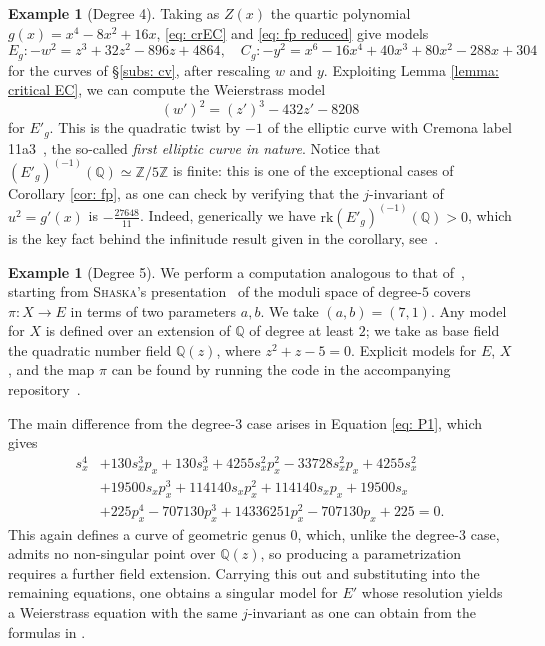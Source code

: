 \documentclass[a4paper,twoside,english]{amsart}
\theoremstyle{plain}
\theoremstyle{definition}
\newtheorem{example}[theorem]{Example}
\begin{document}
\begin{example}[Degree 4]
Taking as $Z(x)$ the quartic polynomial $g(x)=x^4-8x^2+16x$, \eqref{eq: crEC} and \eqref{eq: fp reduced} give models 
\[ E_g:-w^2=z^3 + 32z^2 - 896z + 4864, \quad C_g:-y^2=x^6 - 16x^4 + 40x^3 + 80x^2 - 288x + 304 \]
for the curves of \S\ref{subs: cv}, after rescaling $w$ and $y$. Exploiting Lemma \ref{lemma: critical EC}, we can compute the Weierstrass model $$(w')^2=(z')^3-432z'-8208$$ for $E'_g$. This is the quadratic twist by $-1$ of the elliptic curve with Cremona label 11a3~\cite{lmfdb}, the so-called \textit{first elliptic curve in nature}. Notice that $(E'_g)^{(-1)}(\mathbb{Q})\simeq\mathbb{Z}/5\mathbb{Z}$ is finite: this is one of the exceptional cases of Corollary \ref{cor: fp}, as one can check by verifying that the $j$-invariant of $u^2=g'(x)$ is $-\frac{27648}{11}$.
Indeed, generically we have $\mathrm{rk}(E'_g)^{(-1)}(\mathbb{Q})>0$, which is the key fact behind the infinitude result given in the corollary, see~\cite[\S 4]{nac2}.

\end{example}
\begin{example}[Degree 5]
    \label{example: degree 5}
We perform a computation analogous to that of~, starting from
\textsc{Shaska}'s presentation~\cite{Shaska} of the moduli space of degree-$5$ covers
$\pi \colon X \to E$ in terms of two parameters $a, b$. We take $(a,b) = (7,1)$.
Any model for $X$ is defined over an extension of $\mathbb{Q}$ of degree at least $2$; we take as base field
the quadratic number field $\mathbb{Q}(z)$, where $z^2 + z - 5 = 0$. Explicit models for $E$, $X$,
and the map $\pi$ can be found by running the code in the accompanying repository~\cite{repo4}.

The main difference from the degree-$3$ case arises in Equation \eqref{eq: P1}, which gives
\begin{align*}
    s_x^4 & + 130 s_x^3 p_x + 130 s_x^3
    + 4255 s_x^2 p_x^2 - 33728 s_x^2 p_x + 4255 s_x^2 \\
    &+ 19500 s_x p_x^3 + 114140 s_x p_x^2 + 114140 s_x p_x + 19500 s_x \\
    &+ 225 p_x^4 - 707130 p_x^3 + 14336251 p_x^2 - 707130 p_x + 225 = 0.
\end{align*}
This again defines a curve of geometric genus $0$, which, unlike the degree-$3$ case, admits no non-singular point over $\mathbb{Q}(z)$, so producing a parametrization requires a further field
extension. Carrying this out and substituting into the remaining equations, one obtains
a singular model for $E'$ whose resolution yields a Weierstrass equation with the
same $j$-invariant as one can obtain from the formulas in \cite{Shaska}.
\end{example}
\end{document}
